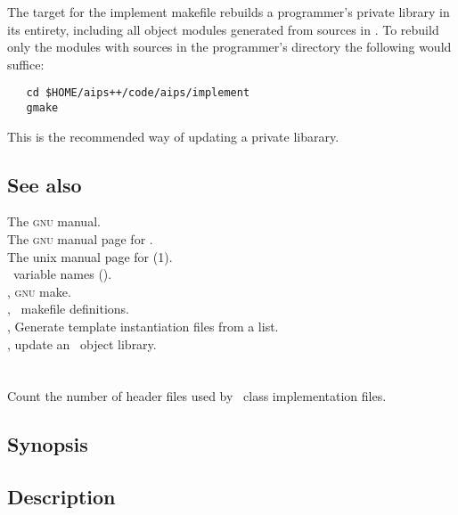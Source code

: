 The  target for the implement makefile rebuilds a programmer's
private library in its entirety, including all object modules generated from
sources in .  To rebuild only the modules with sources in the
programmer's directory the following would suffice:

\begin{verbatim}
   cd $HOME/aips++/code/aips/implement
   gmake
\end{verbatim}

\noindent
This is the recommended way of updating a private libarary.

\subsection*{See also}

The \textsc{gnu}  manual.\\
The \textsc{gnu} manual page for .\\
The unix manual page for (1).\\
\aipspp\ variable names ().\\
, \textsc{gnu} make.\\
, \aipspp\ makefile definitions.\\
, Generate template instantiation files from a list.\\
, update an \aipspp\ object library.


\newpage
\section{}
\label{depstat}

Count the number of header files used by \aipspp\ class implementation files.

\subsection*{Synopsis}

\begin{synopsis}
\end{synopsis}

\subsection*{Description}

